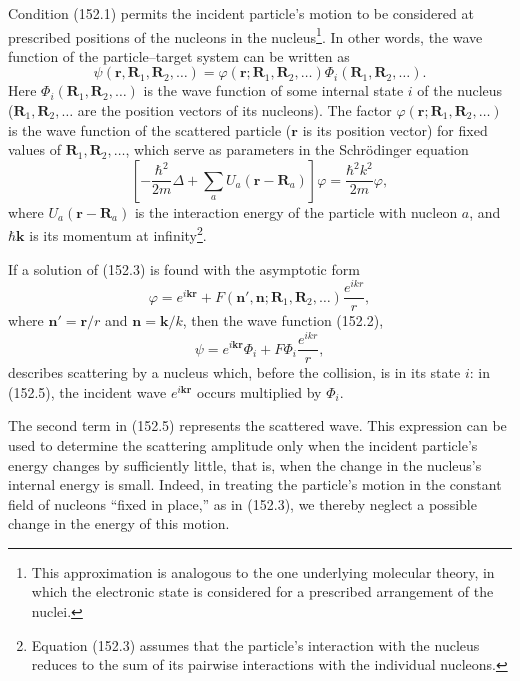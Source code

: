 Condition (152.1) permits the incident particle's motion to be considered at prescribed positions of the nucleons in the nucleus\footnote{This approximation is analogous to the one underlying molecular theory, in which the electronic state is considered for a prescribed arrangement of the nuclei.}. In other words, the wave function of the particle--target system can be written as
\begin{equation}
 \psi(\mathbf r,\mathbf R_1,\mathbf R_2,\ldots)
 =\varphi(\mathbf r;\mathbf R_1,\mathbf R_2,\ldots)\Phi_i(\mathbf R_1,\mathbf R_2,\ldots).
 \tag{152.2}
\end{equation}
Here $\Phi_i(\mathbf R_1,\mathbf R_2,\ldots)$ is the wave function of some internal state $i$ of the nucleus ($\mathbf R_1,\mathbf R_2,\ldots$ are the position vectors of its nucleons). The factor $\varphi(\mathbf r;\mathbf R_1,\mathbf R_2,\ldots)$ is the wave function of the scattered particle ($\mathbf r$ is its position vector) for fixed values of $\mathbf R_1,\mathbf R_2,\ldots$, which serve as parameters in the Schrödinger equation
\begin{equation}
 \left[-\frac{\hbar^2}{2m}\Delta+\sum_a U_a(\mathbf r-\mathbf R_a)\right]\varphi
 =\frac{\hbar^2k^2}{2m}\varphi,
 \tag{152.3}
\end{equation}
where $U_a(\mathbf r-\mathbf R_a)$ is the interaction energy of the particle with nucleon $a$, and $\hbar\mathbf k$ is its momentum at infinity\footnote{Equation (152.3) assumes that the particle's interaction with the nucleus reduces to the sum of its pairwise interactions with the individual nucleons.}.

If a solution of (152.3) is found with the asymptotic form
\begin{equation}
 \varphi=e^{i\mathbf k\mathbf r}+F(\mathbf n',\mathbf n;\mathbf R_1,\mathbf R_2,\ldots)\frac{e^{ikr}}r,
 \tag{152.4}
\end{equation}
where $\mathbf n'=\mathbf r/r$ and $\mathbf n=\mathbf k/k$, then the wave function (152.2),
\begin{equation}
 \psi=e^{i\mathbf k\mathbf r}\Phi_i+F\Phi_i\frac{e^{ikr}}r,
 \tag{152.5}
\end{equation}
describes scattering by a nucleus which, before the collision, is in its state $i$: in (152.5), the incident wave $e^{i\mathbf k\mathbf r}$ occurs multiplied by $\Phi_i$.

The second term in (152.5) represents the scattered wave. This expression can be used to determine the scattering amplitude only when the incident particle's energy changes by sufficiently little, that is, when the change in the nucleus's internal energy is small. Indeed, in treating the particle's motion in the constant field of nucleons ``fixed in place,'' as in (152.3), we thereby neglect a possible change in the energy of this motion.

